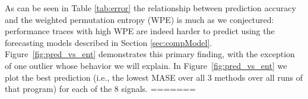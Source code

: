 \documentclass{article}
\begin{document}
As can be seen in Table \ref{tab:error} the relationship between prediction accuracy and the weighted permutation entropy (WPE) is much as we conjectured: performance traces with high WPE are
indeed harder to predict using the forecasting models described in Section \ref{sec:compModel}. Figure~\ref{fig:pred_vs_ent} demonstrates this primary finding, with
the exception of one outlier whose behavior we will explain. In Figure~\ref{fig:pred_vs_ent} we plot the best prediction (i.e., the lowest MASE over all 3 methods over all runs of that program) for each of the 8 signals.  
=======











\end{document}
